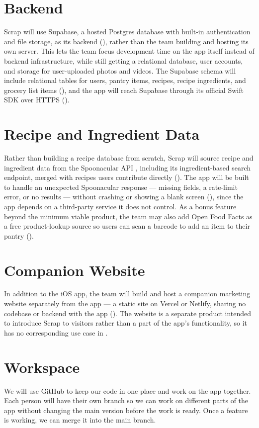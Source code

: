 \section{Backend}
Scrap will use Supabase, a hosted Postgres database with built-in authentication and file storage, as its backend (), rather than the team building and hosting its own server. This lets the team focus development time on the app itself instead of backend infrastructure, while still getting a relational database, user accounts, and storage for user-uploaded photos and videos. The Supabase schema will include relational tables for users, pantry items, recipes, recipe ingredients, and grocery list items (), and the app will reach Supabase through its official Swift SDK over HTTPS \cite{SupabaseiOSQuickstart} ().

\section{Recipe and Ingredient Data}
Rather than building a recipe database from scratch, Scrap will source recipe and ingredient data from the Spoonacular API \cite{SpoonacularAPI}, including its ingredient-based search endpoint, merged with recipes users contribute directly (). The app will be built to handle an unexpected Spoonacular response --- missing fields, a rate-limit error, or no results --- without crashing or showing a blank screen (), since the app depends on a third-party service it does not control. As a bonus feature beyond the minimum viable product, the team may also add Open Food Facts as a free product-lookup source so users can scan a barcode to add an item to their pantry ().

\section{Companion Website}
In addition to the iOS app, the team will build and host a companion marketing website separately from the app --- a static site on Vercel or Netlify, sharing no codebase or backend with the app (). The website is a separate product intended to introduce Scrap to visitors rather than a part of the app's functionality, so it has no corresponding use case in .

\section{Workspace}
We will use GitHub to keep our code in one place and work on the app together. Each person will have their own branch so we can work on different parts of the app without changing the main version before the work is ready. Once a feature is working, we can merge it into the main branch.

